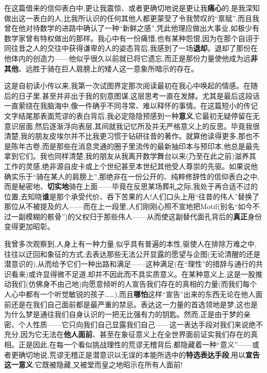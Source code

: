 在这篇借来的信仰表白中,更让我震惊、或者更确切地说是更让我\textbf{痛心}的,是我深知做出这一表白的人,比我所认识的任何其他人都更蒙受了令我赞叹的“禀赋”,而且我曾在他对待数学的进路中确认了一种“新鲜之感”,凭此他理应做出大事业,如极少有数学家曾有特权做出的那样\dmark{}。我心中有一份痛惜,也有某种怨恨,因为在那个自诩于同往昔之人的交往中获得谦卑的人的姿态背后,我感到了一场\textbf{退却}。退却了那份在他体内的创造力——他似乎很久以前就已将它遗忘,而正是那份力量使他成为远\textbf{非其他}、远胜于骑在巨人肩膀上的矮人这一意象所暗示的存在。

这是自初读小传以来,我第一次试图界定那次阅读最初在我心中唤起的情感。在随后的日子里,甚至并非出于我的刻意图谋,这层思考一直在发酵。尤其是最后这段话一直萦绕在我脑海中,像一件确乎不同寻常、难以释怀的事情。在这篇短小的传记文字结尾那表面荒谬的表白背后,我必定隐隐预感到一种\textbf{意义},它最初无疑停留在无意识层面,然后逐渐浮向表层,其间就我记忆所及并无严格意义上的反思。毕竟我很清楚,我的朋友皮埃尔并不比我更习惯于钻研往昔的著作。就算他读得更多,那也不是陈年古卷,而是那些在消息灵通的圈子里流传的最新抽印本与预印本,他总是最先拿到它们。我也同样清楚,我的朋友从我离开数学舞台以来(乃至在此之前)滋养其工作的灵感,绝非源自皮卡或上个世纪甚至本世纪其他受人尊崇的先驱。如果说他确实乐于“骑在某人的肩膀上”,那绝非在一份公开的、纯粹修辞性的信仰表白之中,而是秘密地、\textbf{切实地}骑在上面——毕竟在反思某场葬礼之际,我处于再合适不过的位置,去知晓\textbf{谁}是那个承受代价、吞下苦果的人!人们口头上用“往昔的伟人”替换了那位从不被提及的人——而在上一段里,人们刚刚心照不宣地把Motif(别名“如今不过一副模糊的骸骨”)的父权归于那些伟人\dmark{}——从而使这副替代面孔背后的\textbf{真正}身份变得更加昭彰。

我曾多次观察到,人身上有一种力量,似乎具有普遍的本性,驱使人在排除万难之中,往往以迂回和象征的方式,去表达那些无法公开显露的愿望与企图(无论清醒的还是潜意识的),从而给予它们一种出路和满足——这种满足(在“理性”的措辞与通行的共识看来)或许显得微不足道,却并不因此而不具实质意义。在某种意义上,这是一股推动我们(仿佛身不由己地)向愿意倾听的人宣告我们存在的真相的力量(而我们每个人心中都有一个听觉敏锐的孩子……),而且\textbf{哪怕}这样“宣告”出来的东西无论在他人面前还是在我们自己面前都是最严重的禁忌。表达这一力量的首选领地是梦,这也是为什么梦是通往我们自身认识的一把无比强有力的钥匙。然而,正是由于梦的亲密、个人性质——它只向我们自己显露我们自己——这一表达手段对我们来说绝不充分,因为它无法在\textbf{他人面前}、甚至在象征意义上在全世界面前证实我们存在的真相。正是因此,在每一个看似挑战理性的荒谬无稽背后,都隐藏着一种“意义”——或者更确切地说,荒谬无稽正是潜意识以无误的本能所选中的\textbf{特选表达手段},用以\textbf{宣告这一意义}:它既被隐藏,又被堂而皇之地昭示在所有人面前!

